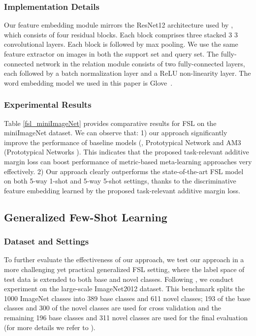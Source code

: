 \documentclass[10pt,twocolumn,letterpaper]{article}
\begin{document}
\subsubsection{Implementation Details}

 Our feature embedding module mirrors the ResNet12 architecture used by \cite{Oreshkin2018nips}, which consists of four residual blocks. Each block comprises three stacked 3  3 convolutional layers. Each block is followed by max pooling. We use the same feature extractor on images in both the support set and query set. The fully-connected network in the relation module consists of two fully-connected layers, each followed by a batch normalization layer and a ReLU non-linearity layer. The word embedding model we used in this paper is Glove~\cite{glove}.

\subsubsection{Experimental Results}
\label{sec: mini}
Table \ref{fsl_miniImageNet} provides comparative results for FSL on the miniImageNet dataset. We can observe that: 1) our approach significantly improve the performance of baseline models (\ie, Prototypical Network \cite{Snell2017nips} and AM3 (Prototypical Networks \cite{Chen2019NIPS}). This indicates that the proposed task-relevant additive margin loss can boost performance of metric-based meta-learning approaches very effectively. 2) Our approach clearly outperforms the state-of-the-art FSL model on both 5-way 1-shot and 5-way 5-shot settings, thanks to the discriminative feature embedding learned by the proposed task-relevant additive margin loss. 

\subsection{Generalized Few-Shot Learning}

\subsubsection{Dataset and Settings}

To further evaluate the effectiveness of our approach, we test our approach in a more challenging yet practical generalized FSL setting, where the label space of test data is extended to both base and novel classes. Following \cite{Hariharan2017iccv,Wang2018cvprlsl,Gidaris2018cvpr}, we conduct experiment on the large-scale ImageNet2012 dataset. This benchmark splits the 1000 ImageNet classes into 389 base classes and 611 novel classes; 193 of the base classes and 300 of the novel classes are used for cross validation and the remaining 196 base classes and 311 novel classes are used for the final evaluation (for more details we refer to \cite{Hariharan2017iccv,Wang2018cvprlsl}). 
\end{document}
